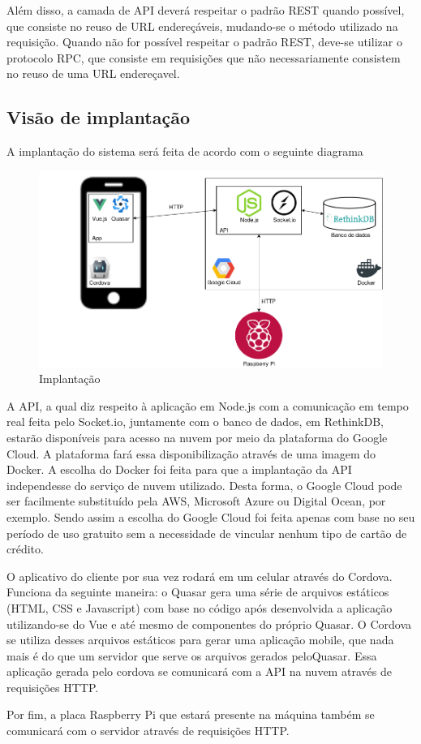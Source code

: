 \begin{apendicesenv}
Além disso, a camada de API deverá respeitar o padrão REST quando possível, que consiste no reuso de URL endereçáveis, mudando-se o método utilizado na requisição. Quando não for possível respeitar o padrão REST, deve-se utilizar o protocolo RPC, que consiste em requisições que não necessariamente consistem no reuso de uma URL endereçavel.

\subsection{Visão de implantação}
A implantação do sistema será feita de acordo com o seguinte diagrama

\begin{figure}[!ht]
	\centering
		\includegraphics[scale=0.4]{figuras/software/9-implantacao.png}
	\caption{Implantação}
\end{figure}

A API, a qual diz respeito à aplicação em Node.js com a comunicação em tempo real feita pelo Socket.io, juntamente com o banco de dados, em RethinkDB, estarão disponíveis para acesso na nuvem por meio da plataforma do Google Cloud. A plataforma fará essa disponibilização através de uma imagem do Docker. A escolha do Docker foi feita para que a implantação da API independesse do serviço de nuvem utilizado. Desta forma, o Google Cloud pode ser facilmente substituído pela AWS, Microsoft Azure ou Digital Ocean, por exemplo. Sendo assim a escolha do Google Cloud foi feita apenas com base no seu período de uso gratuito sem a necessidade de vincular nenhum tipo de cartão de crédito.

O aplicativo do cliente por sua vez rodará em um celular através do Cordova. Funciona da seguinte maneira: o Quasar gera uma série de arquivos estáticos (HTML, CSS e Javascript) com base no código após desenvolvida a aplicação utilizando-se do Vue e até mesmo de componentes do próprio Quasar. O Cordova se utiliza desses arquivos estáticos para gerar uma aplicação mobile, que nada mais é do que um servidor que serve os arquivos gerados peloQuasar. Essa aplicação gerada pelo cordova se comunicará com a API na nuvem através de requisições HTTP.

Por fim, a placa Raspberry Pi que estará presente na máquina também se comunicará com
o servidor através de requisições HTTP.

\end{apendicesenv}
